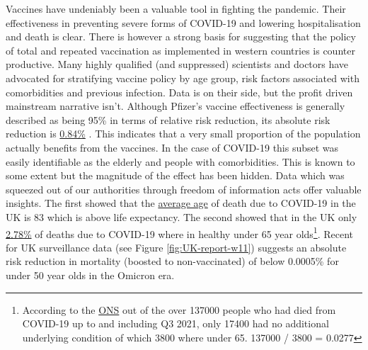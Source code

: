 \documentclass[11pt,a4paper,notitlepage]{report}
\begin{document}
Vaccines have undeniably been a valuable tool in fighting the pandemic. Their effectiveness in preventing severe forms of COVID-19 and lowering hospitalisation and death is clear. There is however a strong basis for suggesting that the policy of total and repeated vaccination as implemented in western countries is counter productive. Many highly qualified (and suppressed) scientists and doctors have advocated for stratifying vaccine policy by age group, risk factors associated with comorbidities and previous infection. Data is on their side, but the profit driven mainstream narrative isn't. Although Pfizer's vaccine effectiveness is generally described as being 95\% in terms of relative risk reduction, its absolute risk reduction is \href{https://www.thelancet.com/journals/lanmic/article/PIIS2666-5247(21)00069-0/fulltext}{0.84\%} \cite{lancet20042021}. This indicates that a very small proportion of the population actually benefits from the vaccines. In the case of COVID-19 this subset was easily identifiable as the elderly and people with comorbidities. This is known to some extent but the magnitude of the effect has been hidden. Data which was squeezed out of our authorities through freedom of information acts offer valuable insights. The first showed that the \href{https://www.ons.gov.uk/aboutus/transparencyandgovernance/freedomofinformationfoi/averageageofthosewhohaddiedwithcovid19}{average age} of death due to COVID-19 in the UK is 83 \cite{freedomofinformationfoi11012021} which is above life expectancy. The second showed that in the UK only \href{https://www.ons.gov.uk/aboutus/transparencyandgovernance/freedomofinformationfoi/deathsfromcovid19withnootherunderlyingcauses}{2.78\%} \cite{freedomofinformationfoi16122021} of deaths due to COVID-19 where in healthy under 65 year olds\footnote{According to the \href{https://www.ons.gov.uk/aboutus/transparencyandgovernance/freedomofinformationfoi/deathsfromcovid19withnootherunderlyingcauses}{ONS} \cite{freedomofinformationfoi16122021} out of the over 137000 people who had died from COVID-19 up to and including Q3 2021, only 17400 had no additional underlying condition of which 3800 where under 65. 137000 / 3800 = 0.0277}. Recent  for UK surveillance data (see Figure \ref{fig:UK-report-w11}) suggests an absolute risk reduction in mortality (boosted to non-vaccinated) of below 0.0005\% for under 50 year olds in the Omicron era.

\end{document}
